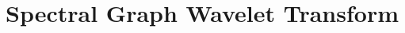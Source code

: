 %
%
%




\chapter{Spectral Graph Wavelet Transform\label{chapter:sgwt}}

\begin{refsection}








\clearpage

\printbibliography[heading=subbibliography]
\end{refsection}
